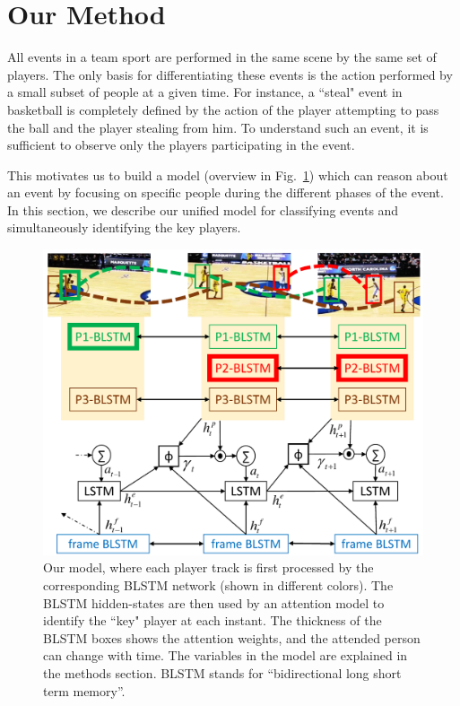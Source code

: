 \section{Our Method}
\label{sec:methods}

All events in a team sport are performed in the same scene by the same set
of players. The only basis for differentiating these events is the action
performed by a small subset of people at a given time.  For instance, a
``steal" event in basketball is completely defined by the action of the player attempting to
pass the ball and the player stealing from him.  To understand such an event,
it is sufficient to observe only the players participating in the event.

This motivates us to build a model (overview in Fig.~\ref{fig:model})
which can reason about an event by focusing
on specific people during the different phases of the event.
In this section, we describe our unified model for classifying events
and simultaneously identifying the key players.

\begin{figure}[t!]
\begin{center}
    \includegraphics[width=3 in]{images/system_figure_1_cropped_v2.pdf}
\end{center}
   \caption{Our model, where each player track is first processed by the
     corresponding BLSTM network (shown in different colors). The BLSTM
     hidden-states are then used by an attention model to identify the ``key"
     player at each instant.  The thickness of the BLSTM boxes shows the
     attention weights, and the attended person can change with time.  The
     variables in the model are explained in the methods section.  BLSTM stands
     for ``bidirectional long short term memory''. 
}
\label{fig:model}
\end{figure}

